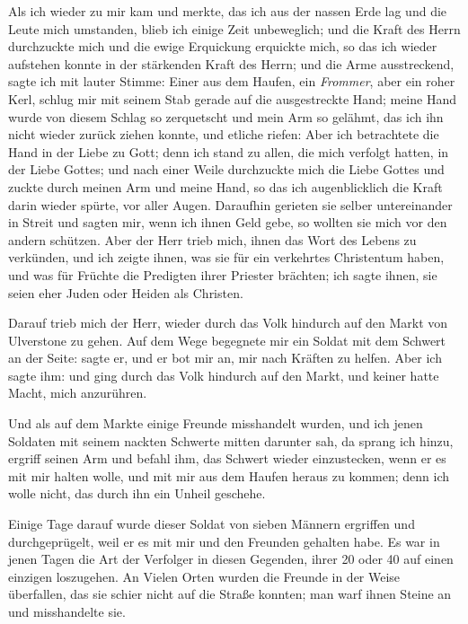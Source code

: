 Als ich wieder zu mir kam und merkte, das ich aus der nassen
Erde lag und die Leute mich umstanden, blieb ich einige
Zeit unbeweglich; und die Kraft des Herrn durchzuckte mich und
die ewige Erquickung erquickte mich, so das ich wieder aufstehen
konnte in der stärkenden Kraft des Herrn; und die Arme 
ausstreckend, sagte ich mit lauter Stimme:  Einer aus
dem Haufen, ein \textit{Frommer}, aber ein roher Kerl, schlug mir
mit seinem Stab gerade auf die ausgestreckte Hand; meine Hand
wurde von diesem Schlag so zerquetscht und mein Arm so 
gelähmt, das ich ihn nicht wieder zurück ziehen konnte, und etliche
riefen:  Aber ich betrachtete die Hand in der
Liebe zu Gott; denn ich stand zu allen, die mich verfolgt hatten,
in der Liebe Gottes; und nach einer Weile durchzuckte mich die
Liebe Gottes und zuckte durch meinen Arm und meine Hand,
so das ich augenblicklich die Kraft darin wieder spürte, vor aller
Augen. Daraufhin gerieten sie selber untereinander in Streit und
sagten mir, wenn ich ihnen Geld gebe, so wollten sie mich vor
den andern schützen. Aber der Herr trieb mich, ihnen das Wort
des Lebens zu verkünden, und ich zeigte ihnen, was sie für ein
verkehrtes Christentum haben, und was für Früchte die Predigten
ihrer Priester brächten; ich sagte ihnen, sie seien 
eher Juden oder Heiden als Christen. 


Darauf trieb mich der Herr, wieder durch
das Volk hindurch auf den Markt von Ulverstone zu gehen. Auf
dem Wege begegnete mir ein Soldat mit dem Schwert an der
Seite:  sagte er, 
und er bot mir
an, mir nach Kräften zu helfen. Aber ich sagte ihm: 
 und ging 
durch das Volk hindurch auf
den Markt, und keiner hatte Macht, mich anzurühren. 

Und als
auf dem Markte einige Freunde misshandelt wurden, und ich jenen
Soldaten mit seinem 
nackten Schwerte 
mitten darunter sah, da
sprang ich hinzu, ergriff seinen Arm und befahl ihm, das Schwert
wieder einzustecken, wenn er es mit mir halten wolle, und mit
mir aus dem Haufen heraus zu kommen; denn ich wolle nicht,
das durch ihn ein Unheil geschehe. 

Einige Tage darauf wurde
dieser Soldat von sieben Männern ergriffen und durchgeprügelt,
weil er es mit mir und den Freunden gehalten habe. Es war
in jenen Tagen die Art der Verfolger in diesen Gegenden,
ihrer 20 oder 40 auf einen einzigen loszugehen. An Vielen Orten
wurden die Freunde in der Weise überfallen, das sie schier nicht
auf die Straße konnten; man warf ihnen Steine an und 
misshandelte sie. 

